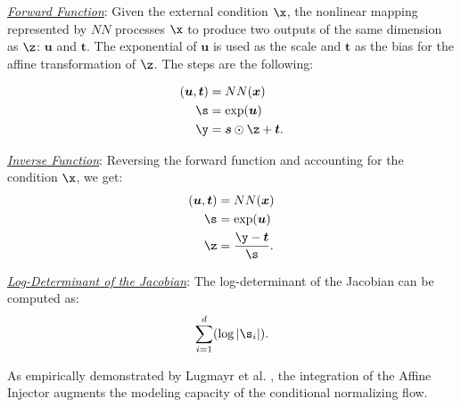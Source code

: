\smallskip

\textit{\underline{Forward Function}}:
Given the external condition \(\x\), the nonlinear mapping represented by \(NN\) processes \(\x\) to produce two outputs of the same dimension as \(\z\): \(\boldsymbol{u}\) and \(\boldsymbol{t}\). The exponential of \(\boldsymbol{u}\) is used as the scale and \(\boldsymbol{t}\) as the bias for the affine transformation of \(\z\). The steps are the following:

\begin{align*}
(\boldsymbol{u}, \boldsymbol{t}) &= NN(\boldsymbol{x}) \\
\s &= \exp(\boldsymbol{u}) \\
\y &= \boldsymbol{s} \odot \z + \boldsymbol{t}.
\end{align*}

\smallskip

\textit{\underline{Inverse Function}}:
Reversing the forward function and accounting for the condition \(\x\), we get:
\begin{align*}
(\boldsymbol{u}, \boldsymbol{t}) &= NN(\boldsymbol{x}) \\
\s &= \exp(\boldsymbol{u}) \\
\z &= \frac{\y - \boldsymbol{t}}{\s}.
\end{align*}

\smallskip

\textit{\underline{Log-Determinant of the Jacobian}}:
The log-determinant of the Jacobian can be computed as:
\[\sum_{i=1}^{d}(\log |\s_i|).\]

As empirically demonstrated by Lugmayr et al. \cite{SRFLOW}, the integration of the Affine Injector augments the modeling capacity of the conditional normalizing flow.

